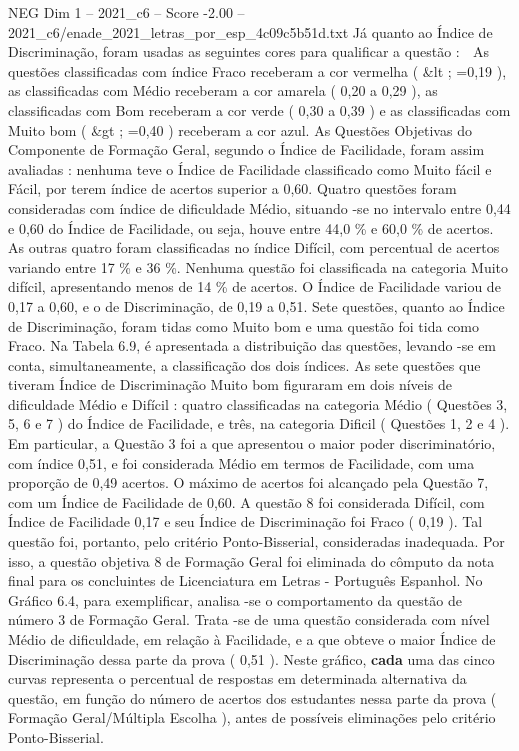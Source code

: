 \begin{textsample}{NEG Dim 1 – 2021\_c6 – Score -2.00 – 2021\_c6/enade\_2021\_letras\_por\_esp\_4c09c5b51d.txt}
Já quanto ao Índice de Discriminação, foram usadas as seguintes cores para qualificar a questão :  As questões classificadas com índice Fraco receberam a cor vermelha ( \&lt ; =0,19 ), as classificadas com Médio receberam a cor amarela ( 0,20 a 0,29 ), as classificadas com Bom receberam a cor verde ( 0,30 a 0,39 ) e as classificadas com Muito bom ( \&gt ; =0,40 ) receberam a cor azul.
As Questões Objetivas do Componente de Formação Geral, segundo o Índice de Facilidade, foram assim avaliadas : nenhuma teve o Índice de Facilidade classificado como Muito fácil e Fácil, por terem índice de acertos superior a 0,60.
Quatro questões foram consideradas com índice de dificuldade Médio, situando -se no intervalo entre 0,44 e 0,60 do Índice de Facilidade, ou seja, houve entre 44,0 \% e 60,0 \% de acertos.
As outras quatro foram classificadas no índice Difícil, com percentual de acertos variando entre 17 \% e 36 \%.
Nenhuma questão foi classificada na categoria Muito difícil, apresentando menos de 14 \% de acertos.
O Índice de Facilidade variou de 0,17 a 0,60, e o de Discriminação, de 0,19 a 0,51.
Sete questões, quanto ao Índice de Discriminação, foram tidas como Muito bom e uma questão foi tida como Fraco.
Na Tabela 6.9, é apresentada a distribuição das questões, levando -se em conta, simultaneamente, a classificação dos dois índices.
As sete questões que tiveram Índice de Discriminação Muito bom figuraram em dois níveis de dificuldade Médio e Difícil : quatro classificadas na categoria Médio ( Questões 3, 5, 6 e 7 ) do Índice de Facilidade, e três, na categoria Dificil ( Questões 1, 2 e 4 ).
Em particular, a Questão 3 foi a que apresentou o maior poder discriminatório, com índice 0,51, e foi considerada Médio em termos de Facilidade, com uma proporção de 0,49 acertos.
O máximo de acertos foi alcançado pela Questão 7, com um Índice de Facilidade de 0,60.
A questão 8 foi considerada Difícil, com Índice de Facilidade 0,17 e seu Índice de Discriminação foi Fraco ( 0,19 ).
Tal questão foi, portanto, pelo critério Ponto-Bisserial, consideradas inadequada.
Por isso, a questão objetiva 8 de Formação Geral foi eliminada do cômputo da nota final para os concluintes de Licenciatura em Letras - Português Espanhol.
No Gráfico 6.4, para exemplificar, analisa -se o comportamento da questão de número 3 de Formação Geral.
Trata -se de uma questão considerada com nível Médio de dificuldade, em relação à Facilidade, e a que obteve o maior Índice de Discriminação dessa parte da prova ( 0,51 ).
Neste gráfico, \textbf{cada} uma das cinco curvas representa o percentual de respostas em determinada alternativa da questão, em função do número de acertos dos estudantes nessa parte da prova ( Formação Geral/Múltipla Escolha ), antes de possíveis eliminações pelo critério Ponto-Bisserial.

\end{textsample}

